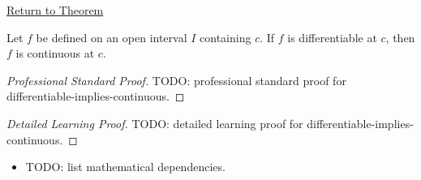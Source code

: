 \newpage
{}
\label{prf:differentiable-implies-continuous}

\begin{remark*}[Return]
\hyperref[thm:differentiable-implies-continuous]{Return to Theorem}
\end{remark*}

\begin{theorem*}
Let $f$ be defined on an open interval $I$ containing $c$. If $f$ is differentiable at $c$, then $f$ is continuous at $c$.
\end{theorem*}

\begin{proof}[Professional Standard Proof]
\LRAProofBodyStart
TODO: professional standard proof for differentiable-implies-continuous.
\end{proof}

\begin{proof}[Detailed Learning Proof]
\LRAProofBodyStart
TODO: detailed learning proof for differentiable-implies-continuous.
\end{proof}

\begin{remark*}
\end{remark*}

\begin{dependencies}
\begin{itemize}
  \item TODO: list mathematical dependencies.
\end{itemize}
\end{dependencies}

\clearpage
